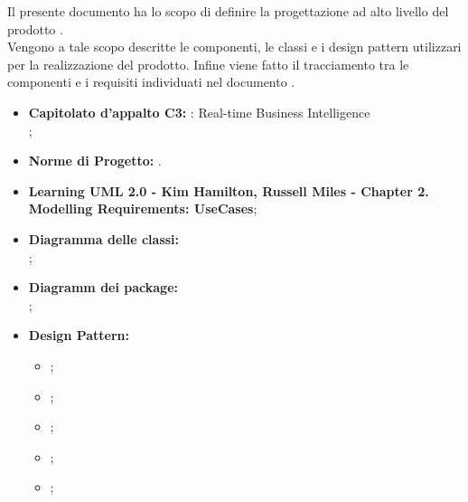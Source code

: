 
		Il presente documento ha lo scopo di definire la progettazione ad alto livello del prodotto \projectname{}.\\
		Vengono a tale scopo descritte le componenti, le classi e i design pattern utilizzari per la realizzazione del prodotto. Infine viene fatto il tracciamento tra le componenti e i requisiti individuati nel documento .

	

		\begin{itemize}
			\item\textbf{Capitolato d'appalto C3:} \projectname{}: Real-time Business Intelligence \\
				;
			\item \textbf{Norme di Progetto:} .
		\end{itemize}
		\begin{itemize}
			\item \textbf{Learning UML 2.0 - Kim Hamilton, Russell Miles - Chapter 2. Modelling Requirements: UseCases};
			\item \textbf{Diagramma delle classi:} \\;
			\item \textbf{Diagramm dei package:} \\;
			\item \textbf{Design Pattern:}
				\begin{itemize}
					\item {};
					\item {};
					\item {};
					\item {};
					\item {};
				\end{itemize}
		\end{itemize}
